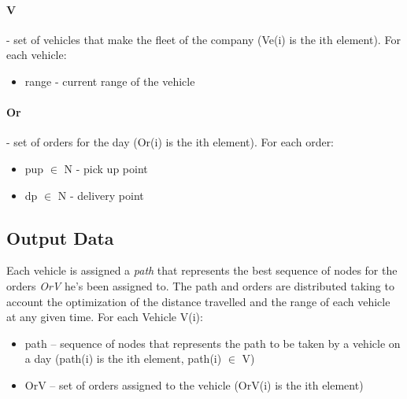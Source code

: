 \paragraph{V} - set of vehicles that make the fleet of the company (Ve(i) is the ith element). For each vehicle:
\begin{itemize}
	\item range - current range of the vehicle
\end{itemize}

\paragraph{Or} - set of orders for the day (Or(i) is the ith element). For each order:
\begin{itemize}
    \item pup $ \in $  N - pick up point
	\item dp $ \in $  N - delivery point
\end{itemize}


\subsection{Output Data}
Each vehicle is assigned a \textit{path} that represents the best sequence of nodes for the orders \textit{OrV} he's been assigned to. The path and orders are distributed taking to account the optimization of the distance travelled and the range of each vehicle at any given time.
For each Vehicle V(i):
\begin{itemize}
	\item path – sequence of nodes that represents the path to be taken by a vehicle on a day (path(i) is the ith element, path(i) $ \in $  V)
	\item OrV – set of orders assigned to the vehicle (OrV(i) is the ith element)
\end{itemize}
